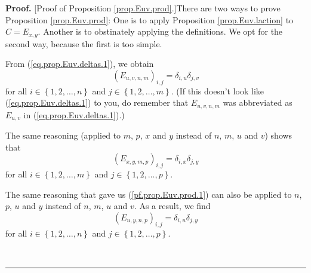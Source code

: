 \documentclass[numbers=enddot,12pt,final,onecolumn,notitlepage]{scrartcl}%
\theoremstyle{definition}
\newenvironment{proof}[1][Proof]{\noindent\textbf{#1.} }{\ \rule{0.5em}{0.5em}}
\begin{document}
\begin{proof}
[Proof of Proposition \ref{prop.Euv.prod}.]There are two ways to prove
Proposition \ref{prop.Euv.prod}: One is to apply Proposition
\ref{prop.Euv.laction} to $C=E_{x,y}$. Another is to obstinately applying the
definitions. We opt for the second way, because the first is too simple.

From (\ref{eq.prop.Euv.deltas.1}), we obtain%
\begin{equation}
\left(  E_{u,v,n,m}\right)  _{i,j}=\delta_{i,u}\delta_{j,v}
\label{pf.prop.Euv.prod.1}%
\end{equation}
for all $i\in\left\{  1,2,\ldots,n\right\}  $ and $j\in\left\{  1,2,\ldots
,m\right\}  $. (If this doesn't look like (\ref{eq.prop.Euv.deltas.1}) to you,
do remember that $E_{u,v,n,m}$ was abbreviated as $E_{u,v}$ in
(\ref{eq.prop.Euv.deltas.1}).)

The same reasoning (applied to $m$, $p$, $x$ and $y$ instead of $n$, $m$, $u$
and $v$) shows that%
\begin{equation}
\left(  E_{x,y,m,p}\right)  _{i,j}=\delta_{i,x}\delta_{j,y}
\label{pf.prop.Euv.prod.2}%
\end{equation}
for all $i\in\left\{  1,2,\ldots,m\right\}  $ and $j\in\left\{  1,2,\ldots
,p\right\}  $.

The same reasoning that gave us (\ref{pf.prop.Euv.prod.1}) can also be applied
to $n$, $p$, $u$ and $y$ instead of $n$, $m$, $u$ and $v$. As a result, we
find%
\begin{equation}
\left(  E_{u,y,n,p}\right)  _{i,j}=\delta_{i,u}\delta_{j,y}
\label{pf.prop.Euv.prod.3}%
\end{equation}
for all $i\in\left\{  1,2,\ldots,n\right\}  $ and $j\in\left\{  1,2,\ldots
,p\right\}  $.


\end{proof}
\end{document}
